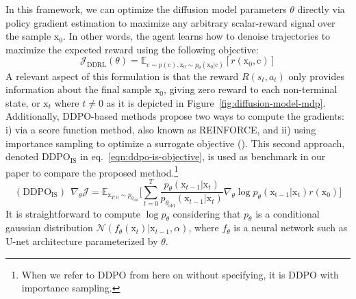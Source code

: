 In this framework, we can optimize the diffusion
model parameters $\theta$ directly via policy
gradient estimation to maximize any arbitrary
scalar-reward signal over the sample $\mathrm{x}_{0}$.
In other words, the agent learns how to denoise trajectories to maximize the expected reward using the following objective:
\begin{equation}\label{difusion-rl-objective-1}
  \mathcal{J}_{\text{DDRL}}(\theta)
  = \mathbb{E}_{\mathrm{c}\sim p(\mathrm{c}),  \mathrm{x}_{0}\sim p_{\theta}(\mathrm{x}_{0}|\mathrm{c})}[ r(\mathrm{x}_{0}, \mathrm{c})]
\end{equation}
A relevant aspect of this formulation is that the reward $R(s_{t}, a_{t})$
only provides information about the final sample $\mathrm{x}_{0}$, giving zero
reward to each non-terminal state, or $\mathrm{x}_{t}$ where $t\neq0$ as it is
depicted in Figure~\ref{fig:diffusion-model-mdp}. Additionally, DDPO-based methods propose two ways to compute the gradients: i) via a score function method, also known as REINFORCE, and ii) using importance sampling to optimize a surrogate objective (\citet{schulman2015trust, schulman2017proximal}). This second approach, denoted $\text{DDPO}_{\text{IS}}$ in eq.~\eqref{eqn:ddpo-is-objective}, is used as benchmark in our paper to compare the proposed method.\footnote{When we refer to DDPO from here on without specifying, it is DDPO with importance sampling.} 
\begin{equation}\label{eqn:ddpo-is-objective}
  (\text{DDPO}_{\text{IS}})~~ \nabla_{\theta}\mathcal{J} = \mathbb{E}_{\mathrm{x}_{T:0}\sim p_{\theta_{\text{old}}}} \bigg[\sum_{t=0}^{T}\frac{p_{\theta}(\mathrm{x}_{t-1}|\mathrm{x}_{t})}{p_{\theta_{\text{old}}}(\mathrm{x}_{t-1}|\mathrm{x}_{t})}\nabla_{\theta}\log p_{\theta}(\mathrm{x_{t-1}|\mathrm{x}_t}) r(\mathrm{x}_{0})\bigg]
\end{equation}
It is straightforward to compute $\log p_{\theta}$ considering that
$p_{\theta}$ is a conditional gaussian distribution 
$\mathcal{N}(f_{\theta}(\mathrm{x}_{t}) | \mathrm{x}_{t-1}, \alpha)$, where
$f_{\theta}$ is a neural network such as U-net architecture parameterized by $\theta$.


